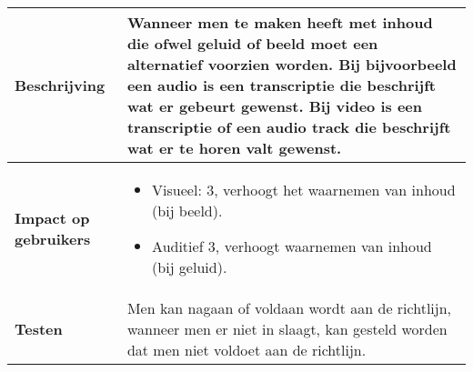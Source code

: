 \begin{table}[H]
\begin{tabular}{|l|p{12cm}|}
        \hline
        \textbf{Beschrijving}                & Wanneer men te maken heeft met inhoud die ofwel geluid of beeld moet een alternatief voorzien worden. Bij bijvoorbeeld een audio is een transcriptie die beschrijft wat er gebeurt gewenst. Bij video is een transcriptie of een audio track die beschrijft wat er te horen valt gewenst. \\ 
        \hline
        \textbf{Impact op gebruikers}        & 
        \begin{itemize}
            \item Visueel: 3, verhoogt het waarnemen van inhoud (bij beeld).
            \item Auditief 3, verhoogt waarnemen van inhoud (bij geluid).             
        \end{itemize}                                                                                                                   \\ 
        \hline
        \textbf{Testen}                      & Men kan nagaan of voldaan wordt aan de richtlijn, wanneer men er niet in slaagt, kan gesteld worden dat men niet voldoet aan de richtlijn.                                                                                                                                                                                                            \\
        \hline
    \end{tabular}
\end{table}
\newpage
